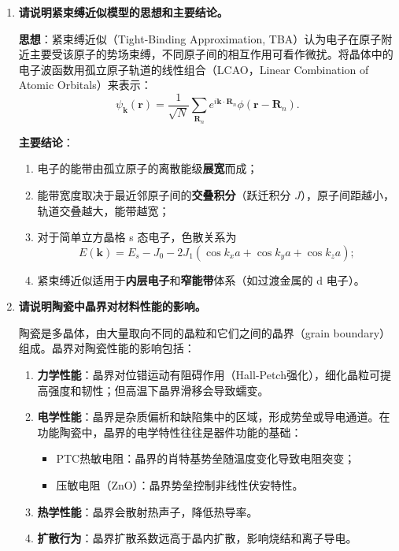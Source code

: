 \begin{enumerate}[label=\textbf{\arabic*.}, leftmargin=2em, itemsep=0.8em, resume]
\item \textbf{请说明紧束缚近似模型的思想和主要结论。}

\textbf{思想}：紧束缚近似（Tight-Binding Approximation, TBA）认为电子在原子附近主要受该原子的势场束缚，不同原子间的相互作用可看作微扰。将晶体中的电子波函数用孤立原子轨道的线性组合（LCAO，Linear Combination of Atomic Orbitals）来表示：
\[
    \psi_{\mathbf{k}}(\mathbf{r}) = \frac{1}{\sqrt{N}} \sum_{\mathbf{R}_n} e^{i\mathbf{k}\cdot\mathbf{R}_n} \phi(\mathbf{r} - \mathbf{R}_n).
\]

\textbf{主要结论}：
\begin{enumerate}[nosep, label=(\arabic*)]
    \item 电子的能带由孤立原子的离散能级\textbf{展宽}而成；
    \item 能带宽度取决于最近邻原子间的\textbf{交叠积分}（跃迁积分 $J$），原子间距越小，轨道交叠越大，能带越宽；
    \item 对于简单立方晶格 s 态电子，色散关系为
    \[
        E(\mathbf{k}) = E_s - J_0 - 2J_1(\cos k_x a + \cos k_y a + \cos k_z a);
    \]
    \item 紧束缚近似适用于\textbf{内层电子}和\textbf{窄能带}体系（如过渡金属的 d 电子）。
\end{enumerate}

\item \textbf{请说明陶瓷中晶界对材料性能的影响。}

陶瓷是多晶体，由大量取向不同的晶粒和它们之间的晶界（grain boundary）组成。晶界对陶瓷性能的影响包括：
\begin{enumerate}[nosep, label=(\arabic*)]
    \item \textbf{力学性能}：晶界对位错运动有阻碍作用（Hall-Petch强化），细化晶粒可提高强度和韧性；但高温下晶界滑移会导致蠕变。
    \item \textbf{电学性能}：晶界是杂质偏析和缺陷集中的区域，形成势垒或导电通道。在功能陶瓷中，晶界的电学特性往往是器件功能的基础：
    \begin{itemize}[nosep]
        \item PTC热敏电阻：晶界的肖特基势垒随温度变化导致电阻突变；
        \item 压敏电阻（ZnO）：晶界势垒控制非线性伏安特性。
    \end{itemize}
    \item \textbf{热学性能}：晶界会散射热声子，降低热导率。
    \item \textbf{扩散行为}：晶界扩散系数远高于晶内扩散，影响烧结和离子导电。
\end{enumerate}


\end{enumerate}
